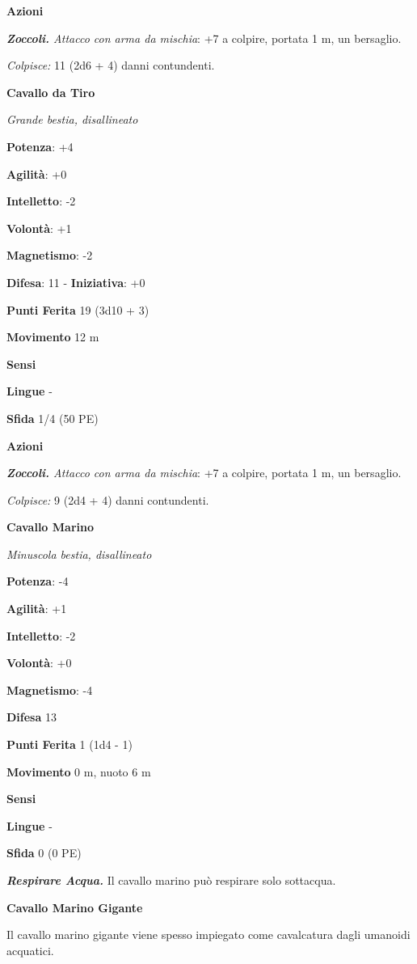 \begin{multicols}{2}
\smallskip\textbf{Azioni}

\emph{\textbf{Zoccoli.} Attacco con arma da mischia}: +7 a colpire,
portata 1 m, un bersaglio.

\emph{Colpisce:} 11 (2d6 + 4) danni contundenti.

\textbf{Cavallo da Tiro}

\emph{Grande bestia, disallineato}

\textbf{Potenza}: +4

\textbf{Agilità}: +0

\textbf{Intelletto}: -2

\textbf{Volontà}: +1

\textbf{Magnetismo}: -2

\textbf{Difesa}: 11 - \textbf{Iniziativa}: +0

\textbf{Punti Ferita} 19 (3d10 + 3)

\textbf{Movimento} 12 m

\textbf{Sensi} 

\textbf{Lingue} -

\textbf{Sfida} 1/4 (50 PE)\smallskip

\smallskip\textbf{Azioni}

\emph{\textbf{Zoccoli.} Attacco con arma da mischia}: +7 a colpire,
portata 1 m, un bersaglio.

\emph{Colpisce:} 9 (2d4 + 4) danni contundenti.

\textbf{Cavallo Marino}

\emph{Minuscola bestia, disallineato}

\textbf{Potenza}: -4

\textbf{Agilità}: +1

\textbf{Intelletto}: -2

\textbf{Volontà}: +0

\textbf{Magnetismo}: -4

\textbf{Difesa} 13

\textbf{Punti Ferita} 1 (1d4 - 1)

\textbf{Movimento} 0 m, nuoto 6 m

\textbf{Sensi} 

\textbf{Lingue} -

\textbf{Sfida} 0 (0 PE)\smallskip

\emph{\textbf{Respirare Acqua.}} Il cavallo marino può respirare solo
sottacqua.

\textbf{Cavallo Marino Gigante}

Il cavallo marino gigante viene spesso impiegato come cavalcatura dagli
umanoidi acquatici.


\end{multicols}
